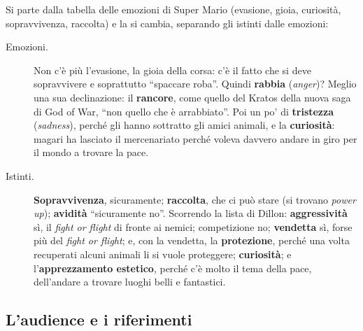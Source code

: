 Si parte dalla tabella delle emozioni di Super Mario (evasione, gioia,
curiosità, sopravvivenza, raccolta) e la si cambia, separando gli istinti dalle
emozioni:
\begin{description}
  \item[Emozioni.] Non c'è più l'evasione, la gioia della corsa: c'è il fatto
        che si deve sopravvivere e soprattutto ``spaccare roba''. Quindi
        \textbf{rabbia} (\emph{anger})? Meglio una sua declinazione: il
        \textbf{rancore}, come quello del Kratos della nuova saga di God of War,
        ``non quello che è arrabbiato''. Poi un po' di \textbf{tristezza}
        (\emph{sadness}), perché gli hanno sottratto gli amici animali, e la
        \textbf{curiosità}: magari ha lasciato il mercenariato perché voleva
        davvero andare in giro per il mondo a trovare la pace.
  \item[Istinti.] \textbf{Sopravvivenza}, sicuramente; \textbf{raccolta}, che ci
        può stare (si trovano \emph{power up}); \textbf{avidità} ``sicuramente
        no''. Scorrendo la lista di Dillon: \textbf{aggressività} sì, il
        \emph{fight or flight} di fronte ai nemici; competizione no;
        \textbf{vendetta} sì, forse più del \emph{fight or flight}; e, con la
        vendetta, la \textbf{protezione}, perché una volta recuperati alcuni
        animali li si vuole proteggere; \textbf{curiosità}; e
        l'\textbf{apprezzamento estetico}, perché c'è molto il tema della pace,
        dell'andare a trovare luoghi belli e fantastici.
\end{description}

\subsection{L'audience e i riferimenti}

